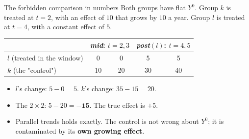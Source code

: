\documentclass[
  11pt,
  ignorenonframetext,
  aspectratio=169,
]{beamer}
\providecommand{\tightlist}{%
  \setlength{\itemsep}{0pt}\setlength{\parskip}{0pt}}
\begin{document}
\begin{frame}{The forbidden comparison in numbers}
\protect{}\label{the-forbidden-comparison-in-numbers}
Both groups have flat \(Y^0\). Group \(k\) is treated at \(t = 2\), with
an effect of \(10\) that grows by \(10\) a year. Group \(l\) is treated
at \(t = 4\), with a constant effect of \(5\).

\begin{center}\small
\begin{tabular}{lcccc}
\toprule
 & \multicolumn{2}{c}{\emph{mid}: $t = 2, 3$} & \multicolumn{2}{c}{\emph{post}$(l)$: $t = 4, 5$} \\
\midrule
$l$ (treated in the window) & 0 & 0 & 5 & 5 \\
$k$ (the "control") & 10 & 20 & 30 & 40 \\
\bottomrule
\end{tabular}
\end{center}

\begin{itemize}
\tightlist
\item
  \(l\)'s change: \(5 - 0 = 5\). \(k\)'s change: \(35 - 15 = 20\).
\item
  The \(2 \times 2\): \(5 - 20 = \mathbf{-15}\). The true effect is
  \(+5\).
\item
  Parallel trends holds exactly. The control is not wrong about \(Y^0\);
  it is contaminated by its \textbf{own growing effect}.
\end{itemize}
\end{frame}
\end{document}
